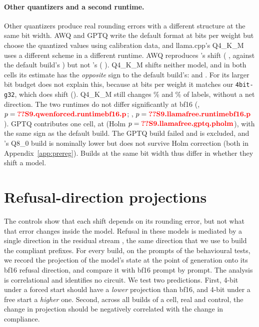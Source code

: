 \paragraph{Other quantizers and a second runtime.}
Other quantizers produce real rounding errors with a different structure at the same bit width. AWQ and GPTQ write the default format at  bits per weight but choose the quantized values using calibration data, and llama.cpp's Q4\_K\_M uses a different scheme in a different runtime. AWQ reproduces \qwen's shift (\pp{} , against the default build's ) but not \llama's (\pp{} ). Q4\_K\_M shifts neither model, and in both cells its estimate has the \emph{opposite} sign to the default build's: \pp{}  and \pp{} . For \qwen{} its larger bit budget does not explain this, because at  bits per weight it matches our \texttt{4bit-g32}, which does shift \qwen{} (\pp{}). Q4\_K\_M still changes \% and \% of labels, without a net direction. The two runtimes do not differ significantly at bf16 (\pp, $p=\N{S9.qwenforced.runtimebf16.p}$; \pp, $p=\N{S9.llamafree.runtimebf16.p}$). GPTQ contributes one cell, \llama{} at \pp{}  (Holm $p=\N{S9.llamafree.gptq.pholm}$), with the same sign as the default build. The \qwen{} GPTQ build failed and is excluded, and \llama's Q8\_0 build is nominally lower but does not survive Holm correction (both in Appendix~\ref{app:prereg}). Builds at the same bit width thus differ in whether they shift a model.

\section{Refusal-direction projections}
\label{sec:direction}

The controls show that each shift depends on its rounding error, but not what that error changes inside the model. Refusal in these models is mediated by a single direction in the residual stream \citep{arditi2024refusal}, the same direction that we use to build the compliant prefixes. For every build, on the prompts of the behavioural tests, we record the projection of the model's state at the point of generation onto its bf16 refusal direction, and compare it with bf16 prompt by prompt. The analysis is correlational and identifies no circuit. We test two predictions. First, 4-bit \qwen{} under a forced start should have a \emph{lower} projection than bf16, and 4-bit \llama{} under a free start a \emph{higher} one. Second, across all builds of a cell, real and control, the change in projection should be negatively correlated with the change in compliance.

